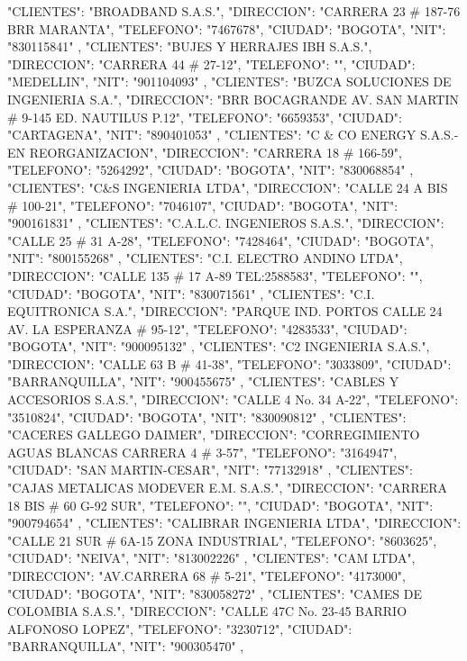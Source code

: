   {
   "CLIENTES": "BROADBAND S.A.S.",
   "DIRECCION": "CARRERA 23 # 187-76 BRR MARANTA",
   "TELEFONO": "7467678",
   "CIUDAD": "BOGOTA",
   "NIT": "830115841"
   },
   {
   "CLIENTES": "BUJES Y HERRAJES IBH S.A.S.",
   "DIRECCION": "CARRERA 44 # 27-12",
   "TELEFONO": "",
   "CIUDAD": "MEDELLIN",
   "NIT": "901104093"
   },
   {
   "CLIENTES": "BUZCA SOLUCIONES DE INGENIERIA S.A.",
   "DIRECCION": "BRR BOCAGRANDE AV. SAN MARTIN # 9-145 ED. NAUTILUS P.12",
   "TELEFONO": "6659353",
   "CIUDAD": "CARTAGENA",
   "NIT": "890401053"
   },
   {
   "CLIENTES": "C & CO ENERGY S.A.S.-EN REORGANIZACION",
   "DIRECCION": "CARRERA 18 # 166-59",
   "TELEFONO": "5264292",
   "CIUDAD": "BOGOTA",
   "NIT": "830068854"
   },
   {
   "CLIENTES": "C&S INGENIERIA LTDA",
   "DIRECCION": "CALLE 24 A BIS # 100-21",
   "TELEFONO": "7046107",
   "CIUDAD": "BOGOTA",
   "NIT": "900161831"
   },
   {
   "CLIENTES": "C.A.L.C. INGENIEROS S.A.S.",
   "DIRECCION": "CALLE 25 # 31 A-28",
   "TELEFONO": "7428464",
   "CIUDAD": "BOGOTA",
   "NIT": "800155268"
   },
   {
   "CLIENTES": "C.I. ELECTRO ANDINO LTDA",
   "DIRECCION": "CALLE 135 # 17 A-89 TEL:2588583",
   "TELEFONO": "",
   "CIUDAD": "BOGOTA",
   "NIT": "830071561"
   },
   {
   "CLIENTES": "C.I. EQUITRONICA S.A.",
   "DIRECCION": "PARQUE IND. PORTOS CALLE 24 AV. LA ESPERANZA # 95-12",
   "TELEFONO": "4283533",
   "CIUDAD": "BOGOTA",
   "NIT": "900095132"
   },
   {
   "CLIENTES": "C2 INGENIERIA S.A.S.",
   "DIRECCION": "CALLE 63 B # 41-38",
   "TELEFONO": "3033809",
   "CIUDAD": "BARRANQUILLA",
   "NIT": "900455675"
   },
   {
   "CLIENTES": "CABLES Y ACCESORIOS S.A.S.",
   "DIRECCION": "CALLE 4 No. 34 A-22",
   "TELEFONO": "3510824",
   "CIUDAD": "BOGOTA",
   "NIT": "830090812"
   },
   {
   "CLIENTES": "CACERES GALLEGO DAIMER",
   "DIRECCION": "CORREGIMIENTO AGUAS BLANCAS CARRERA 4 # 3-57",
   "TELEFONO": "3164947",
   "CIUDAD": "SAN MARTIN-CESAR",
   "NIT": "77132918"
   },
   {
   "CLIENTES": "CAJAS METALICAS MODEVER E.M. S.A.S.",
   "DIRECCION": "CARRERA 18 BIS # 60 G-92 SUR",
   "TELEFONO": "",
   "CIUDAD": "BOGOTA",
   "NIT": "900794654"
   },
   {
   "CLIENTES": "CALIBRAR INGENIERIA LTDA",
   "DIRECCION": "CALLE 21 SUR # 6A-15 ZONA INDUSTRIAL",
   "TELEFONO": "8603625",
   "CIUDAD": "NEIVA",
   "NIT": "813002226"
   },
   {
   "CLIENTES": "CAM LTDA",
   "DIRECCION": "AV.CARRERA 68 # 5-21",
   "TELEFONO": "4173000",
   "CIUDAD": "BOGOTA",
   "NIT": "830058272"
   },
   {
   "CLIENTES": "CAMES DE COLOMBIA S.A.S.",
   "DIRECCION": "CALLE 47C No. 23-45 BARRIO ALFONOSO LOPEZ",
   "TELEFONO": "3230712",
   "CIUDAD": "BARRANQUILLA",
   "NIT": "900305470"
   },
